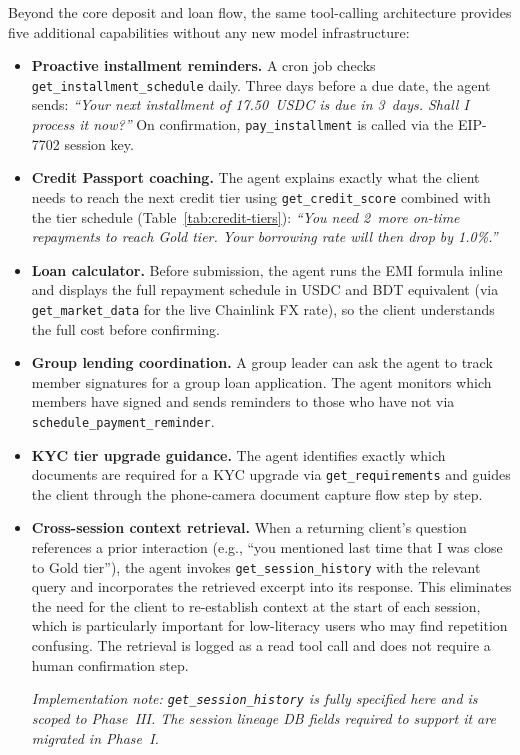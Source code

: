 \documentclass[12pt,a4paper]{report}
\begin{document}
Beyond the core deposit and loan flow, the same tool-calling architecture provides five additional capabilities without any new model infrastructure:

\begin{itemize}[noitemsep]
\item \textbf{Proactive installment reminders.} A cron job checks \texttt{get\_installment\_schedule} daily. Three days before a due date, the agent sends: \emph{``Your next installment of 17.50~USDC is due in 3~days. Shall I process it now?''} On confirmation, \texttt{pay\_installment} is called via the EIP-7702 session key.
\item \textbf{Credit Passport coaching.} The agent explains exactly what the client needs to reach the next credit tier using \texttt{get\_credit\_score} combined with the tier schedule (Table~\ref{tab:credit-tiers}): \emph{``You need 2~more on-time repayments to reach Gold tier. Your borrowing rate will then drop by 1.0\%.''}
\item \textbf{Loan calculator.} Before submission, the agent runs the EMI formula inline and displays the full repayment schedule in USDC and BDT equivalent (via \texttt{get\_market\_data} for the live Chainlink FX rate), so the client understands the full cost before confirming.
\item \textbf{Group lending coordination.} A group leader can ask the agent to track member signatures for a group loan application. The agent monitors which members have signed and sends reminders to those who have not via \texttt{schedule\_payment\_reminder}.
\item \textbf{KYC tier upgrade guidance.} The agent identifies exactly which documents are required for a KYC upgrade via \texttt{get\_requirements} and guides the client through the phone-camera document capture flow step by step.

\item \textbf{Cross-session context retrieval.} When a returning client's question
references a prior interaction (e.g., ``you mentioned last time that I was close to
Gold tier''), the agent invokes \texttt{get\_session\_history} with the relevant
query and incorporates the retrieved excerpt into its response. This eliminates the
need for the client to re-establish context at the start of each session, which is
particularly important for low-literacy users who may find repetition confusing.
The retrieval is logged as a read tool call and does not require a human
confirmation step.

\textit{Implementation note: \texttt{get\_session\_history} is fully specified here
and is scoped to Phase~III. The session lineage DB fields required to support it are
migrated in Phase~I.}
\end{itemize}
\end{document}
